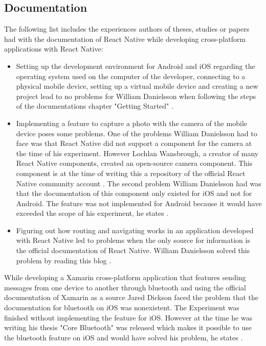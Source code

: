 \documentclass[Bachelor,BIF,english]{twbook}
\begin{document}
\subsection{Documentation}
The following list includes the experiences authors of theses, studies or papers had with the documentation of React Native \cite{ReactNativeDoc} while developing cross-platform applications with React Native: 
\begin{itemize}
\item Setting up the development environment for Android and iOS regarding the operating system used on the computer of the developer, connecting to a physical mobile device, setting up a virtual mobile device and creating a new project lead to no problems for William Danielsson when following the steps of the documentations chapter "Getting Started" \cite[p.~18]{Danielsson_2016}.
\item Implementing a feature to capture a photo with the camera of the mobile device poses some problems. One of the problems William Danielsson had to face was that React Native did not support a component for the camera at the time of his experiment. However Lochlan Wansbrough, a creator of many React Native components, created an open-source camera component. This component is at the time of writing this a repository \cite{ReactNativeCamera} of the official React Native community account \cite{ReactNativeCommunity}. The second problem William Danielsson had was that the documentation of this component only existed for iOS and not for Android. The feature was not implemented for Android because it would have exceeded the scope of his experiment, he states \cite[p.~23-24]{Danielsson_2016}.
\item Figuring out how routing and navigating works in an application developed with React Native led to problems when the only source for information is the official documentation of React Native. William Danielsson solved this problem by reading this blog \cite{ReactNativeBlog} \cite[p.~51]{Danielsson_2016}.
\end{itemize}
While developing a Xamarin cross-platform application that features sending messages from one device to another through bluetooth and using the official documentation of Xamarin \cite{XamarinDoc} as a source Jared Dickson faced the problem that the documentation for bluetooth on iOS was nonexistent. The Experiment was finished without implementing the feature for iOS. However at the time he was writing his thesis "Core Bluetooth" was released which makes it possible to use the bluetooth feature on iOS and would have solved his problem, he states \cite[p.~11]{Dickson_2013}.
\end{document}
